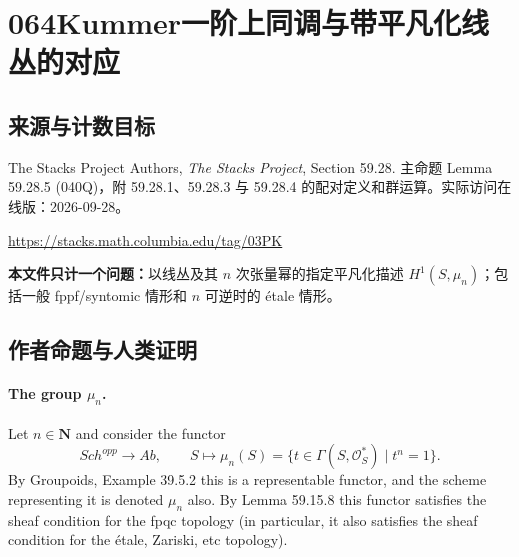 \documentclass[UTF8,11pt]{ctexart}
\theoremstyle{definition}
\begin{document}
\section*{064\quad Kummer一阶上同调与带平凡化线丛的对应}
\subsection*{来源与计数目标}
The Stacks Project Authors, \emph{The Stacks Project}, Section 59.28. 主命题 Lemma 59.28.5 (040Q)，附 59.28.1、59.28.3 与 59.28.4 的配对定义和群运算。实际访问在线版：2026-09-28。
\par\url{https://stacks.math.columbia.edu/tag/03PK}
\par\textbf{本文件只计一个问题：}以线丛及其 $n$ 次张量幂的指定平凡化描述 $H^1(S,\mu_n)$；包括一般 fppf/syntomic 情形和 $n$ 可逆时的 étale 情形。
\subsection*{作者命题与人类证明}
\paragraph{The group $\mu_n$.}
Let $n\in\mathbf N$ and consider the functor
\[
\mathit{Sch}^{opp}\longrightarrow\mathit{Ab},\qquad S\longmapsto\mu_n(S)=\{t\in\Gamma(S,\mathcal O_S^*)\mid t^n=1\}.
\]
By Groupoids, Example 39.5.2 this is a representable functor, and the scheme representing it is denoted $\mu_n$ also. By Lemma 59.15.8 this functor satisfies the sheaf condition for the fpqc topology (in particular, it also satisfies the sheaf condition for the étale, Zariski, etc topology).
\end{document}
